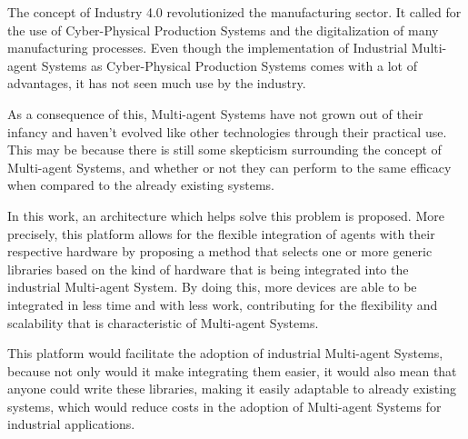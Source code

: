 
%

The concept of Industry 4.0 revolutionized the manufacturing sector. It called for the use of Cyber-Physical Production Systems and the digitalization of many manufacturing processes. Even though the implementation of Industrial Multi-agent Systems as Cyber-Physical Production Systems comes with a lot of advantages, it has not seen much use by the industry.

As a consequence of this, Multi-agent Systems have not grown out of their infancy and haven't evolved like other technologies through their practical use. This may be because there is still some skepticism surrounding the concept of Multi-agent Systems, and whether or not they can perform to the same efficacy when compared to the already existing systems.

In this work, an architecture which helps solve this problem is proposed. More precisely, this platform allows for the flexible integration of agents with their respective hardware by proposing a method that selects one or more generic libraries based on the kind of hardware that is being integrated into the industrial Multi-agent System. By doing this, more devices are able to be integrated in less time and with less work, contributing for the flexibility and scalability that is characteristic of Multi-agent Systems.

This platform would facilitate the adoption of industrial Multi-agent Systems, because not only would it make integrating them easier, it would also mean that anyone could write these libraries, making it easily adaptable to already existing systems, which would reduce costs in the adoption of Multi-agent Systems for industrial applications.

%
%

